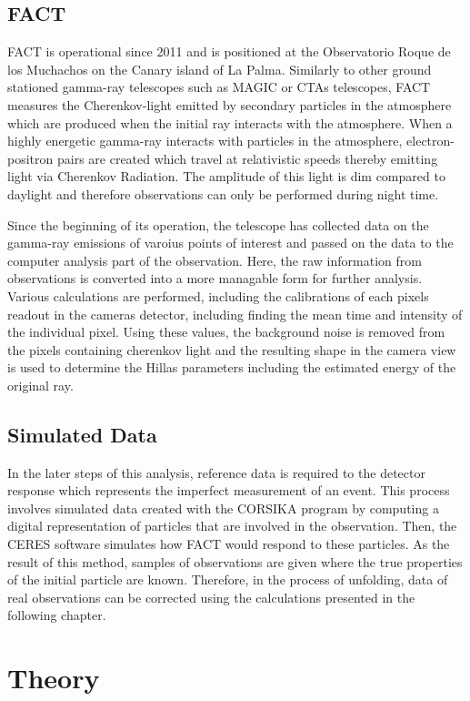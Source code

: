 \subsection{FACT}
FACT is operational since 2011 and is positioned at the Observatorio Roque de los Muchachos on the Canary island of La Palma.    
Similarly to other ground stationed gamma-ray telescopes such as MAGIC or CTAs telescopes, FACT measures the Cherenkov-light emitted by secondary particles in the atmosphere which are produced when the initial ray interacts with the atmosphere.
When a highly energetic gamma-ray interacts with particles in the atmosphere, electron-positron pairs are created which travel at relativistic speeds thereby emitting light via Cherenkov Radiation.
The amplitude of this light is dim compared to daylight and therefore observations can only be performed during night time.

Since the beginning of its operation, the telescope has collected data on the gamma-ray emissions of varoius points of interest and passed on the data to the computer analysis part of the observation.
Here, the raw information from observations is converted into a more managable form for further analysis.
Various calculations are performed, including the calibrations of each pixels readout in the cameras detector, including finding the mean time and intensity of the individual pixel.
Using these values, the background noise is removed from the pixels containing cherenkov light and the resulting shape in the camera view is used to determine the Hillas parameters including the estimated energy of the original ray.

\subsection{Simulated Data}
In the later steps of this analysis, reference data is required to the detector response which represents the imperfect measurement of an event.
This process involves simulated data created with the CORSIKA program \cite{corsika} by computing a digital representation of particles that are involved in the observation.
Then, the CERES software simulates how FACT would respond to these particles.
As the result of this method, samples of observations are given where the true properties of the initial particle are known.
Therefore, in the process of unfolding, data of real observations can be corrected using the calculations presented in the following chapter. 
    \section{Theory}

